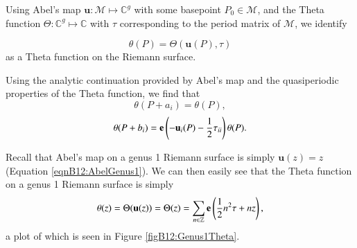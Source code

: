 \begin{definition}
    Using Abel's map $\mathbf{u} : \mathcal M \mapsto \mathbb C^g$ with some basepoint $P_0 \in \mathcal M$, and the Theta function $\Theta : \mathbb C^g \mapsto \mathbb C$ with $\tau$ corresponding to the period matrix of $\mathcal M$, we identify

    \begin{equation}
        \theta(P) = \Theta(\mathbf{u}(P),\tau)
    \end{equation}
    as a Theta function on the Riemann surface.
\end{definition}

\begin{lemma}
    Using the analytic continuation provided by Abel's map and the quasiperiodic properties of the Theta function, we find that
    \begin{equation}
        \theta(P+a_i) = \theta(P),
    \end{equation}
    \begin{equation}
        \theta(P+b_i) = \mathbf{e}\left(-\mathbf{u}_i(P)-\frac{1}{2}\tau_{ii}\right)\theta(P).
    \end{equation}
\end{lemma}

Recall that Abel's map on a genus 1 Riemann surface is simply $\mathbf{u}(z)=z$ (Equation \ref{eqnB12:AbelGenus1}). We can then easily see that the Theta function on a genus 1 Riemann surface is simply
\begin{equation}
    \theta(z) = \Theta(\mathbf{u}(z)) = \Theta(z) = \sum_{n \in \mathbb Z} \mathbf{e}\left(\frac{1}{2}n^2 \tau + n z\right),
\end{equation}
a plot of which is seen in Figure \ref{figB12:Genus1Theta}.

